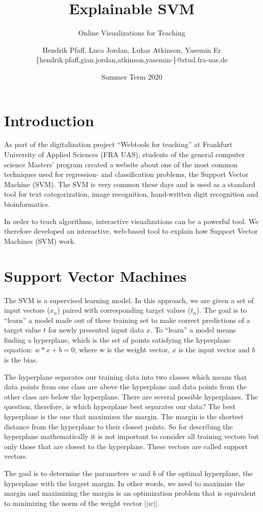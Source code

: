 \documentclass[parskip=half]{scrartcl}
\title{Explainable SVM}
\subtitle{Online Visualizations for Teaching}
\author{
  Hendrik Pfaff, Luca Jordan, Lukas Atkinson, Yasemin Er
  \\
  {\normalsize\ttfamily \{hendrik.pfaff,gian.jordan,atkinson,yasemin-\}@stud.fra-uas.de}
}
\date{Summer Term 2020}
\begin{document}
\maketitle

\section{Introduction}
As part of the digitalization project “Webtools for teaching” at Frankfurt University of Applied Sciences (FRA UAS), students of the general computer science Masters’ program created a website about one of the most common techniques used for regression- and classification problems, the Support Vector Machine (SVM). 
The SVM is very common these days and is used as a standard tool for text categorization, image recognition, hand-written digit recognition and bioinformatics.

In order to teach algorithms, interactive visualizations can be a powerful tool.
We therefore developed an interactive, web-based tool
to explain how Support Vector Machines (SVM) work.

\section{Support Vector Machines}
The SVM is a supervised learning model. In this approach, we are given a set of input vectors ($x_n$) paired with corresponding target values ($t_n$). 
The goal is to “learn” a model made out of these training set to make correct predictions of a target value $t$ for newly presented input data $x$. 
To “learn” a model means finding a hyperplane,
which is the set of points satisfying the hyperplane equation: $w*x+b = 0$,
where w is the weight vector, $x$ is the input vector and $b$ is the bias.

The hyperplane separates our training data into two classes which means that data points from one class are above the hyperplane and data points from the other class are below the hyperplane. 
There are several possible hyperplanes. The question, therefore, is which hyperplane best separates our data? The best hyperplane is the one that maximizes the margin. The margin is the shortest distance from the hyperplane to their closest points. 
So for describing the hyperplane mathematically it is not important to consider all training vectors but only those that are closest to the hyperplane. These vectors are called support vectors. 

The goal is to determine the parameters $w$ and $b$ of the optimal hyperplane, the hyperplane with the largest margin. In other words, we need to maximize the margin and maximizing the margin is an optimization problem that is equivalent to minimizing the norm of the weight vector $||w||$. 
\end{document}
